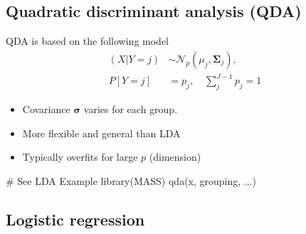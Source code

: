 \subsection{Quadratic discriminant analysis (QDA)}
\begin{theory}
 QDA is based on the following model
 \begin{align*}
  (X|Y=j) & \sim \mathcal{N}_p(\mu_j, \boldsymbol{\Sigma}_j),\\
  P[Y=j]  & = p_j, \quad \sum_j^{J-1}p_j=1
 \end{align*}
 \begin{itemize}
  \item Covariance $\boldsymbol{\sigma}$ varies for each group.
  \item[\leftthumbsup] More flexible and general than LDA
  \item[\leftthumbsdown] Typically overfits for large $p$ (dimension)
 \end{itemize} 
\end{theory}
\begin{code}
 # See LDA Example
 library(MASS)
 qda(x, grouping, ...)
\end{code}

\subsection{Logistic regression}
